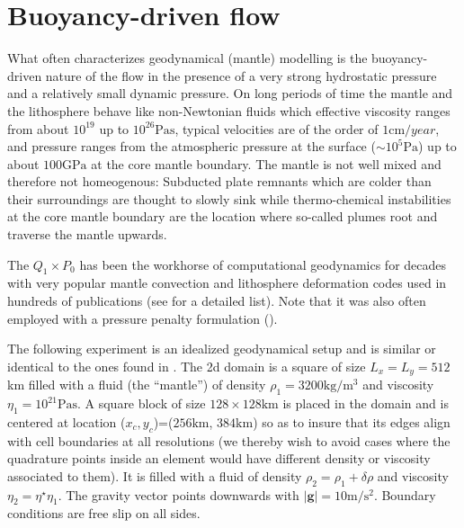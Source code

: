 \documentclass[a4paper,12pt]{article}
\begin{document}
\section{Buoyancy-driven flow}



What often characterizes geodynamical (mantle) modelling is the buoyancy-driven nature of the flow 
in the presence of a very strong hydrostatic pressure and a relatively small dynamic pressure.
On long periods of time the mantle and the lithosphere behave like non-Newtonian fluids
which effective viscosity ranges from about $10^{19}$ up to $10^{26}\si{\pascal\second}$, 
typical velocities are of the order of $1\si{\cm\per year}$, and pressure ranges from 
the atmospheric pressure at the surface ($\sim 10^5 \si{\pascal}$) up to about $100\si{\giga\pascal}$ 
at the core mantle boundary. The mantle is not well mixed and therefore not homeogenous: 
Subducted plate remnants which are colder than their surroundings are thought to slowly sink 
while thermo-chemical instabilities at the core mantle boundary are the location where 
so-called plumes root and traverse the mantle upwards.

The $Q_1\times P_0$ has been the workhorse of computational geodynamics for decades with 
very popular mantle convection and lithosphere deformation codes used in hundreds of publications
(see \cite{thba22} for a detailed list).
Note that it was also often employed with a pressure penalty formulation (\cite{kirh90,full95,brtf08}).

The following experiment is an idealized geodynamical setup
and is similar or identical to the ones found in \cite{mamo08,gery10,thie11,sctc20,thba22,thba25}.
The 2d domain is a square of size $L_x=L_y=512$km filled with a fluid (the ``mantle'')
of density $\rho_1=3200\si{\kg\per\cubic\metre}$ 
and viscosity $\eta_1=10^{21}\si{\pascal\second}$.
A square block of size $128\times 128\si{\km}$ is placed in the domain and
is centered at location ($x_c,y_c$)=($256\si{\km}$, $384\si{\km}$) so 
as to insure that its edges
align with cell boundaries at all resolutions (we thereby wish to avoid
cases where the quadrature points inside an element would have different
density or viscosity associated to them). It is filled with a fluid
of density $\rho_2=\rho_1+\delta \rho$ and viscosity $\eta_2=\eta^\star \eta_1$.
The gravity vector points downwards with $|{\bm g}|=10\si{\metre\per\square\second}$. 
Boundary conditions are free slip on all sides.
\end{document}
